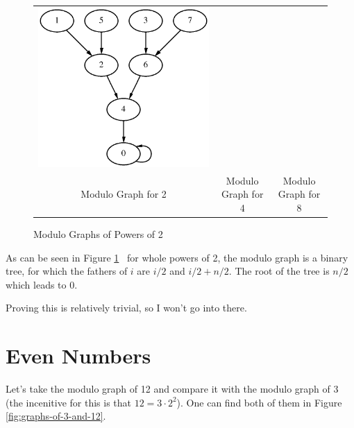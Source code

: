 \documentclass[a4paper]{report}
\begin{document}
\begin{figure}[ht]
\begin{tabular}{ccc}
\includegraphics[scale=0.75]{graph-8.eps} \\
Modulo Graph for 2 &
Modulo Graph for 4 &
Modulo Graph for 8

\end{tabular}
\caption{Modulo Graphs of Powers of 2}
\label{fig:graphs-of-powers-of-2}
\end{figure}

As can be seen in Figure \ref{fig:graphs-of-powers-of-2} ~for whole powers
of 2,  the modulo graph is a binary tree, for which the fathers of $ i $ are
$ i/2 $ and $ i/2 + n/2 $. The root of the tree is $ n/2 $ which leads to 0.

Proving this is relatively trivial, so I won't go into there.

\section{Even Numbers}

Let's take the modulo graph of 12 and compare it with the modulo graph of
3 (the incenitive for this is that $ 12 = 3 \cdot 2^{2} $). One can find
both of them in Figure \ref{fig:graphs-of-3-and-12}.
\end{document}
